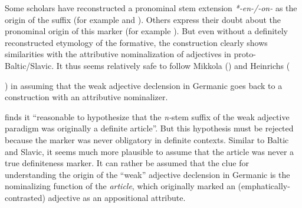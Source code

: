 Some scholars have reconstructed a pronominal stem extension \textit{*-en-/-on-} as the origin of the suffix (for example \citealt[52]{mikkola1950} and \citealt[67]{heinrichs1954}). Others express their doubt about the pronominal origin of this marker (for example \citealt[21 Footnote 6]{schmidt1959}). But even without a definitely reconstructed etymology of the formative, the construction clearly shows similarities with the attributive nominalization of adjectives in proto-Baltic/Slavic. It thus seems relatively safe to follow Mikkola (\citeyear{mikkola1950}) and Heinrichs ({\citeyear{heinrichs1954}) in assuming that the weak adjective declension in Germanic goes back to a construction with an attributive nominalizer.

\citet[170]{ringe2006} finds it “reasonable to hypothesize that the \textit{n-}stem suffix of the weak adjective paradigm was originally a definite article”. But this hypothesis must be rejected because the marker was never obligatory in definite contexts. Similar to Baltic and Slavic, it seems much more plausible to assume that the article was never a true definiteness marker. It can rather be assumed that the clue for understanding the origin of the “weak” adjective declension in Germanic is the nominalizing function of the \textit{article}, which originally marked an (emphatically-contrasted) adjective as an appositional attribute.

}
